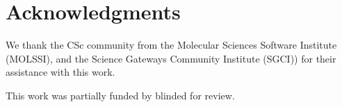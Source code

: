 \documentclass[conference,10pt]{IEEEtran}
\begin{document}


\section{Acknowledgments}

We thank the   CSc community
from the Molecular Sciences Software Institute (MOLSSI), and the Science Gateways Community Institute (SGCI)) for
their assistance with this work.


This work was partially funded by 
blinded for review.

\balance


\end{document}
